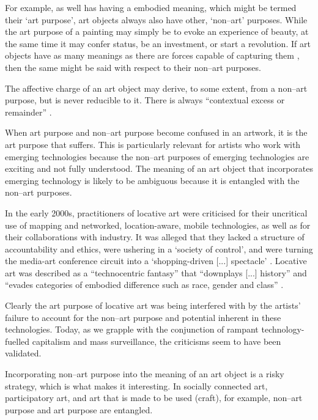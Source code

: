 \documentclass[letter:wpaper]{article}
\begin{document}
    For example, as well has having a embodied meaning, which might be termed their ‘art purpose’, art objects always also have other, ‘non–art’ purposes. While the art purpose of a painting may simply be to evoke an experience of beauty, at the same time it may confer status, be an investment, or start a revolution. If art objects have as many meanings as there are forces capable of capturing them \citep[p.4]{DeleuzeNtschAndPhlsphy2006}, then the same might be said with respect to their non–art purposes.

    The affective charge of an art object may derive, to some extent, from a non–art purpose, but is never reducible to it. There is always ``contextual excess or remainder'' \citep[p.252]{MassumiPrblsFrThVrtl2002}.
    
    When art purpose and non–art purpose become confused in an artwork, it is the art purpose that suffers. This is particularly relevant for artists who work with emerging technologies because the non–art purposes of emerging technologies are exciting and not fully understood. The meaning of an art object that incorporates emerging technology is likely to be ambiguous because it is entangled with the non–art purposes.
    
	In the early 2000s, practitioners of locative art were criticised for their uncritical use of mapping and networked, location-aware, mobile technologies, as well as for their collaborations with industry. It was alleged that they lacked a structure of accountability and ethics, were ushering in a `society of control', and were turning the media-art conference circuit into a `shopping-driven [...] spectacle' \citep[p.358]{beyondLocativeMedia2006}. Locative art was described as a ``technocentric fantasy'' that ``downplays [...] history'' and ``evades categories of embodied difference such as race, gender and class'' \citep[para. 2]{questioningTheFrame2004}.
    
    Clearly the art purpose of locative art was being interfered with by the artists' failure to account for the non–art purpose and potential inherent in these technologies. Today, as we grapple with the conjunction of rampant technology-fuelled capitalism and mass surveillance, the criticisms seem to have been validated. 

    Incorporating non–art purpose into the meaning of an art object is a risky strategy, which is what makes it interesting. In socially connected art, participatory art, and art that is made to be used (craft), for example, non–art purpose and art purpose are entangled. 
    
\end{document}
